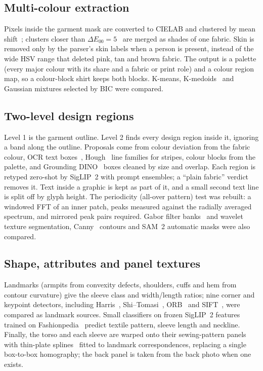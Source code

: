 \documentclass[conference]{IEEEtran}
\begin{document}
\subsection{Multi-colour extraction}
Pixels inside the garment mask are converted to CIELAB and clustered by mean shift~\cite{comaniciu2002meanshift}; clusters closer than $\Delta E_{00}=5$~\cite{sharma2005ciede2000} are merged as shades of one fabric. Skin is removed only by the parser's skin labels when a person is present, instead of the wide HSV range that deleted pink, tan and brown fabric. The output is a palette (every major colour with its share and a fabric or print role) and a colour region map, so a colour-block shirt keeps both blocks. K-means, K-medoids~\cite{kaufman1990} and Gaussian mixtures selected by BIC were compared.

\subsection{Two-level design regions}
Level 1 is the garment outline. Level 2 finds every design region inside it, ignoring a band along the outline. Proposals come from colour deviation from the fabric colour, OCR text boxes~\cite{baek2019craft}, Hough~\cite{duda1972hough} line families for stripes, colour blocks from the palette, and Grounding DINO~\cite{liu2024groundingdino} boxes cleaned by size and overlap. Each region is retyped zero-shot by SigLIP~2 with prompt ensembles; a ``plain fabric'' verdict removes it. Text inside a graphic is kept as part of it, and a small second text line is split off by glyph height. The periodicity (all-over pattern) test was rebuilt: a windowed FFT of an inner patch, peaks measured against the radially averaged spectrum, and mirrored peak pairs required. Gabor filter banks~\cite{jain1991gabor} and wavelet~\cite{mallat1989} texture segmentation, Canny~\cite{canny1986} contours and SAM~2 automatic masks were also compared.

\subsection{Shape, attributes and panel textures}
Landmarks (armpits from convexity defects, shoulders, cuffs and hem from contour curvature) give the sleeve class and width/length ratios; nine corner and keypoint detectors, including Harris~\cite{harris1988}, Shi--Tomasi~\cite{shi1994}, ORB~\cite{rublee2011orb} and SIFT~\cite{lowe2004sift}, were compared as landmark sources. Small classifiers on frozen SigLIP~2 features trained on Fashionpedia~\cite{jia2020fashionpedia} predict textile pattern, sleeve length and neckline. Finally, the torso and each sleeve are warped onto their sewing-pattern panels with thin-plate splines~\cite{bookstein1989tps} fitted to landmark correspondences, replacing a single box-to-box homography; the back panel is taken from the back photo when one exists.
\end{document}
